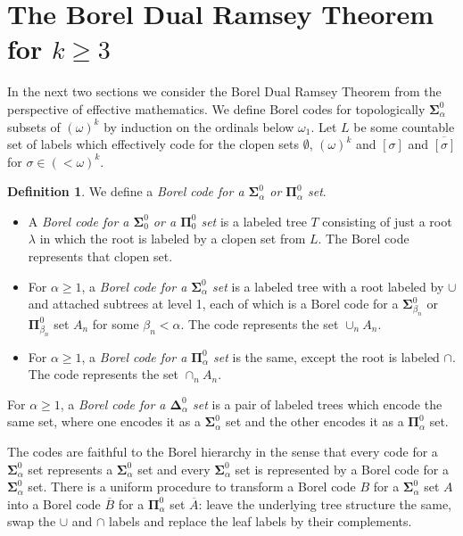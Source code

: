 \documentclass{amsart}
\theoremstyle{definition}
\newtheorem{defn}[thm]{Definition}
\theoremstyle{remark}
\begin{document}
\section{The Borel Dual Ramsey Theorem for $k \geq 3$}\label{sec:3}
\label{sec:Borel3}

In the next two sections we consider the Borel Dual Ramsey Theorem from the perspective of effective mathematics. We define Borel codes for topologically $\mathbf\Sigma^0_\alpha$ subsets of $(\omega)^k$ by induction on the ordinals below $\omega_1$. Let $L$ be some 
countable set of labels which effectively code for the clopen sets $\emptyset$, $(\omega)^k$ and $[\sigma]$ and $\overline{[\sigma]}$ for $\sigma \in (<\omega)^k$. 

\begin{defn} 
\label{defn:effective_borel_codes}
We define a \emph{Borel code for a $\mathbf \Sigma^0_\alpha$ or $\mathbf \Pi^0_\alpha$ set}.
\begin{itemize}
\item A \emph{Borel code for a $\mathbf \Sigma^0_0$ or a $\mathbf \Pi^0_0$ set} is a labeled tree $T$ consisting of just a root $\lambda$ in which the root is 
labeled by a clopen set from $L$. The Borel code represents that clopen set. 
\item For $\alpha \geq 1$, a \emph{Borel code for a $\mathbf\Sigma^0_{\alpha}$ set} is a labeled 
tree with a root labeled by $\cup$ and attached subtrees at level 1, each of which is 
a Borel code for a $\mathbf\Sigma^0_{\beta_n}$ or $\mathbf \Pi^0_{\beta_n}$ set $A_n$ for some 
$\beta_n<\alpha$.  The code represents the set $\cup_n A_n$.
\item For $\alpha \geq 1$, a \emph{Borel code for a $\mathbf\Pi^0_\alpha$ set} is 
the same, except the root is labeled $\cap$. The 
code represents the set $\cap_n A_n$.
\end{itemize}
For $\alpha \geq 1$, a \emph{Borel code for a $\mathbf\Delta^0_\alpha$ set} is a pair of labeled trees 
which encode the same set, where one encodes it as a $\mathbf\Sigma^0_\alpha$ set 
and the other encodes it as a $\mathbf\Pi^0_\alpha$ set.
\end{defn}

The codes are faithful to the Borel hierarchy in the sense that every code for a $\mathbf\Sigma^0_\alpha$ set represents a $\mathbf \Sigma^0_\alpha$ set and every $\mathbf\Sigma^0_{\alpha}$ 
set is represented by a Borel code for a $\mathbf\Sigma^0_{\alpha}$ set. 
There is a uniform procedure to transform a Borel code $B$ for a $\mathbf\Sigma^0_{\alpha}$ set  
$A$ into a Borel code $\overline{B}$ for a $\mathbf \Pi^0_{\alpha}$ set $\overline{A}$: leave the underlying 
tree structure the same, swap the $\cup$ and $\cap$ labels and replace the leaf labels by their complements. 
\end{document}
